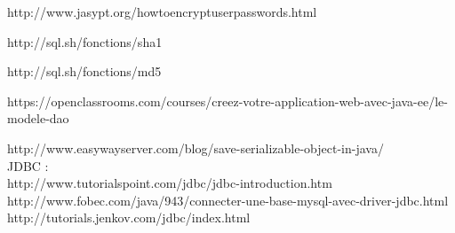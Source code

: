 http://www.jasypt.org/howtoencryptuserpasswords.html

http://sql.sh/fonctions/sha1

http://sql.sh/fonctions/md5

https://openclassrooms.com/courses/creez-votre-application-web-avec-java-ee/le-modele-dao

http://www.easywayserver.com/blog/save-serializable-object-in-java/ \\

JDBC : \\
http://www.tutorialspoint.com/jdbc/jdbc-introduction.htm\\
http://www.fobec.com/java/943/connecter-une-base-mysql-avec-driver-jdbc.html
http://tutorials.jenkov.com/jdbc/index.html